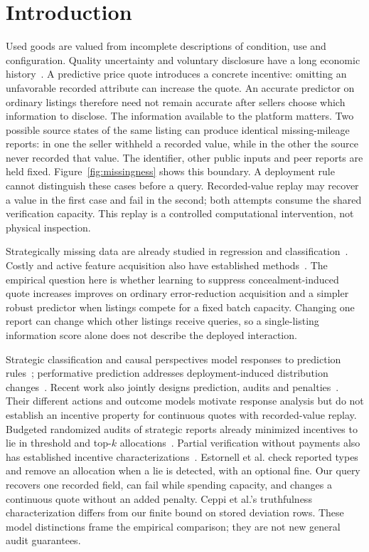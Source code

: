 \documentclass[pdflatex,sn-nature]{sn-jnl}
\begin{document}
\section{Introduction}
Used goods are valued from incomplete descriptions of condition, use and
configuration. Quality uncertainty and voluntary disclosure have a long
economic history~\cite{akerlof1970lemons,grossman1981disclosure,milgrom1981news}.
A predictive price quote introduces a concrete incentive: omitting an
unfavorable recorded attribute can increase the quote. An accurate predictor
on ordinary listings therefore need not remain accurate after sellers choose
which information to disclose. The information available to the platform
matters. Two possible source states of the same listing can produce
identical missing-mileage reports: in one the seller withheld a recorded
value, while in the other the source never recorded that value.
The identifier, other public inputs and peer reports are held fixed.
Figure~\ref{fig:missingness}
shows this boundary. A deployment rule cannot distinguish these cases before
a query. Recorded-value replay may recover a value in the first case and fail
in the second; both attempts consume the shared verification capacity.
This replay is a controlled computational intervention, not physical inspection.

Strategically missing data are already studied in regression and
classification~\cite{zhang2020strategic,krishnaswamy2021withheld}. Costly and
active feature acquisition also have established methods~\cite{janisch2019costly,
shim2018joint,li2021gsm,covert2023information,valancius2024aco}.
The empirical question here is whether learning to suppress concealment-induced
quote increases improves on ordinary error-reduction acquisition and a simpler
robust predictor when listings compete for a fixed batch capacity. Changing one
report can change which other listings receive queries, so a single-listing
information score alone does not describe the deployed interaction.

Strategic classification and causal perspectives model responses to prediction
rules~\cite{hardt2016strategic,dong2018preferences,miller2020causal}; performative
prediction addresses deployment-induced distribution changes~\cite{perdomo2020performative}.
Recent work also jointly designs prediction, audits and
penalties~\cite{ebrahimi2026audit}. Their different actions and outcome models
motivate response analysis but do not establish an incentive property for
continuous quotes with recorded-value replay.
Budgeted randomized audits of strategic reports already minimized incentives
to lie in threshold and top-$k$ allocations~\cite{estornell2021audits}.
Partial verification without payments also has established incentive
characterizations~\cite{ceppi2019verification}.
Estornell et al. check reported types and remove an allocation when a lie
is detected, with an optional fine. Our query recovers one recorded field,
can fail while spending capacity, and changes a continuous quote without
an added penalty. Ceppi et al.'s truthfulness characterization differs from
our finite bound on stored deviation rows. These model distinctions frame
the empirical comparison; they are not new general audit guarantees.
\end{document}
